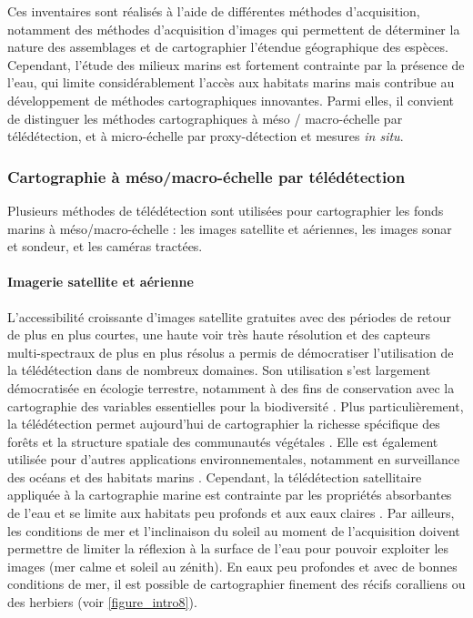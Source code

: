 Ces inventaires sont réalisés à l’aide de différentes méthodes d’acquisition, notamment des méthodes d’acquisition d’images qui permettent de déterminer la nature des assemblages et de cartographier l’étendue géographique des espèces. Cependant, l’étude des milieux marins est fortement contrainte par la présence de l’eau, qui limite considérablement l’accès aux habitats marins mais contribue au développement de méthodes cartographiques innovantes. Parmi elles, il convient de distinguer les méthodes cartographiques à méso / macro-échelle par télédétection, et à micro-échelle par proxy-détection et mesures \textit{in situ}.

\subsubsection{Cartographie à méso/macro-échelle par télédétection}\label{intro.2.2.1}

Plusieurs méthodes de télédétection sont utilisées pour cartographier les fonds marins à méso/macro-échelle : les images satellite et aériennes, les images sonar et sondeur, et les caméras tractées.

\paragraph{Imagerie satellite et aérienne}

L’accessibilité croissante d’images satellite gratuites avec des périodes de retour de plus en plus courtes, une haute voir très haute résolution et des capteurs multi-spectraux de plus en plus résolus a permis de démocratiser l’utilisation de la télédétection dans de nombreux domaines. Son utilisation s’est largement démocratisée en écologie terrestre, notamment à des fins de conservation avec la cartographie des variables essentielles pour la biodiversité \citep{pettorelli_framing_2016, luque_improving_2018, jetz_essential_2019}. Plus particulièrement, la télédétection permet aujourd’hui de cartographier la richesse spécifique des forêts \citep{feret_mapping_2014, vaglio_laurin_biodiversity_2014, baldeck_operational_2015} et la structure spatiale des communautés végétales \citep{rocchini_measuring_2018}. Elle est également utilisée pour d’autres applications environnementales, notamment en surveillance des océans \citep{devi_applications_2015} et des habitats marins \citep{hedley_remote_2016, mccarthy_satellite_2017, appolloni_use_2020, purkis_remote_2018}. Cependant, la télédétection satellitaire appliquée à la cartographie marine est contrainte par les propriétés absorbantes de l’eau et se limite aux habitats peu profonds et aux eaux claires \citep{purkis_remote_2018}. Par ailleurs, les conditions de mer et l’inclinaison du soleil au moment de l’acquisition doivent permettre de limiter la réflexion à la surface de l’eau pour pouvoir exploiter les images (mer calme et soleil au zénith). En eaux peu profondes et avec de bonnes conditions de mer, il est possible de cartographier finement des récifs coralliens ou des herbiers (voir \autoref{figure_intro8}).

